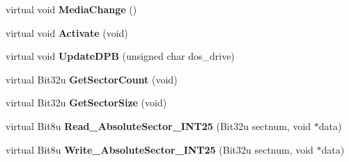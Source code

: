 \begin{DoxyCompactItemize}
\item 
\hypertarget{classDOS__Drive_aceabb46a487741d6c63241539811e80d}{virtual void {\bfseries Media\-Change} ()}\label{classDOS__Drive_aceabb46a487741d6c63241539811e80d}

\item 
\hypertarget{classDOS__Drive_a1007125b58463bbffb07d890fd6f1c61}{virtual void {\bfseries Activate} (void)}\label{classDOS__Drive_a1007125b58463bbffb07d890fd6f1c61}

\item 
\hypertarget{classDOS__Drive_a706c444bff1a6155b5bdc15e8635ce73}{virtual void {\bfseries Update\-D\-P\-B} (unsigned char dos\-\_\-drive)}\label{classDOS__Drive_a706c444bff1a6155b5bdc15e8635ce73}

\item 
\hypertarget{classDOS__Drive_a6fd59860f0716da5035068104a68a2cf}{virtual Bit32u {\bfseries Get\-Sector\-Count} (void)}\label{classDOS__Drive_a6fd59860f0716da5035068104a68a2cf}

\item 
\hypertarget{classDOS__Drive_ae97299ed627e77a4c3339f1e2c510f83}{virtual Bit32u {\bfseries Get\-Sector\-Size} (void)}\label{classDOS__Drive_ae97299ed627e77a4c3339f1e2c510f83}

\item 
\hypertarget{classDOS__Drive_a94f542c8b7122ef5a7b653bad2e2f77d}{virtual Bit8u {\bfseries Read\-\_\-\-Absolute\-Sector\-\_\-\-I\-N\-T25} (Bit32u sectnum, void $\ast$data)}\label{classDOS__Drive_a94f542c8b7122ef5a7b653bad2e2f77d}

\item 
\hypertarget{classDOS__Drive_a66055f5dab842085d207b9ec796a2089}{virtual Bit8u {\bfseries Write\-\_\-\-Absolute\-Sector\-\_\-\-I\-N\-T25} (Bit32u sectnum, void $\ast$data)}\label{classDOS__Drive_a66055f5dab842085d207b9ec796a2089}

\end{DoxyCompactItemize}
